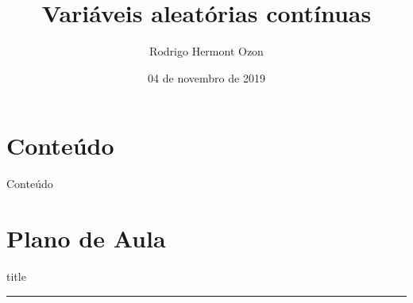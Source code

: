 \documentclass{beamer}
\title{Variáveis aleatórias contínuas}
\author{Rodrigo Hermont Ozon}
\institute{Banca de admissão de professor

\textit{FAE Business School}}
\date{04 de novembro de 2019} %
\begin{document}
{ 
\frame{\titlepage}}

\section*{Conteúdo}\begin{frame}{Conteúdo}\tableofcontents\end{frame}


\section{Plano de Aula}
    \begin{frame}[plain]
        \vfill
      \centering
      \begin{beamercolorbox}[sep=8pt,center,shadow=true,rounded=true]{title}
        \insertsectionhead\par%
        \color{oxfordblue}\noindent\rule{10cm}{1pt} \\
        \LARGE{\faFileTextO}
      \end{beamercolorbox}
      \vfill
  \end{frame}
\end{document}
